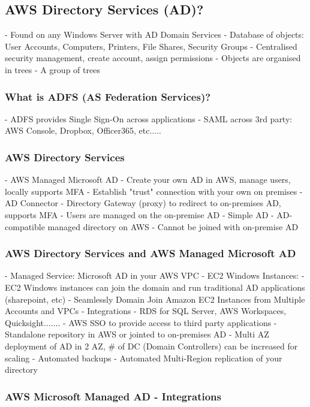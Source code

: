 \documentclass[11pt]{book}
\begin{document}
    \subsection{AWS Directory Services (AD)?}
    - Found on any Windows Server with AD Domain Services
    - Database of objects: User Accounts, Computers, Printers, File Shares, Security Groups
    - Centralised security management, create account, assign permissions
    - Objects are organised in trees
    - A group of trees

    \subsubsection{What is ADFS (AS Federation Services)?}
    - ADFS provides Single Sign-On across applications
    - SAML across 3rd party: AWS Console, Dropbox, Officer365, etc.....

    \subsubsection{AWS Directory Services}
    - AWS Managed Microsoft AD
    - Create your own AD in AWS, manage users, locally supports MFA
    - Establish "trust" connection with your own on premises
    - AD Connector
    - Directory Gateway (proxy) to redirect to on-premises AD, supports MFA
    - Users are managed on the on-premise AD
    - Simple AD
    - AD-compatible managed directory on AWS
    - Cannot be joined with on-premise AD

    \subsubsection{AWS Directory Services and AWS Managed Microsoft AD}
    - Managed Service: Microsoft AD in your AWS VPC
    - EC2 Windows Instances:
    - EC2 Windows instances can join the domain and run traditional AD applications (sharepoint, etc)
    - Seamlessly Domain Join Amazon EC2 Instances from Multiple Accounts and VPCs
    - Integrations
    - RDS for SQL Server, AWS Workspaces, Quicksight.......
    - AWS SSO to provide access to third party applications
    - Standalone repository in AWS or jointed to on-premises AD
    - Multi AZ deployment of AD in 2 AZ, # of DC (Domain Controllers) can be increased for scaling
    - Automated backups
    - Automated Multi-Region replication of your directory

    \subsubsection{AWS Microsoft Managed AD - Integrations}
\end{document}

